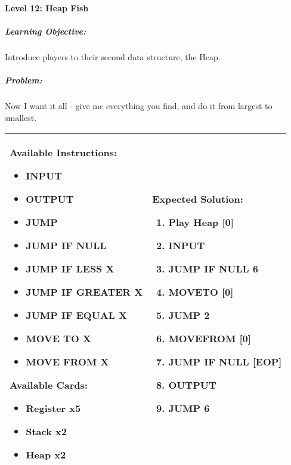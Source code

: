 \paragraph{Level 12: Heap Fish}
\subparagraph{Learning Objective:} Introduce players to their second data structure, the Heap.

\subparagraph{Problem:} Now I want it all - give me everything you find, and do it from largest to smallest.

\begin{center}
    \begin{tabular}{ | m{6cm} | m{8cm} | } 
        \hline
            \textbf{Available Instructions:} 
            \begin{itemize}
                \setlength\itemsep{-.35em}
                \item INPUT
                \item OUTPUT
                \item JUMP
                \item JUMP IF NULL
                \item JUMP IF LESS X
                \item JUMP IF GREATER X
	     \item JUMP IF EQUAL X
                \item MOVE TO X
                \item MOVE FROM X
            \end{itemize}
            \textbf{Available Cards:} 
            \begin{itemize}
                \setlength\itemsep{-.35em}
                \item Register x5
                \item Stack x2
                \item Heap x2
            \end{itemize}& 
            \textbf{Expected Solution:} 
            \begin{enumerate}
                \setlength\itemsep{-.35em}
                \item Play Heap [0]
                \item INPUT
                \item JUMP IF NULL 6
                \item MOVETO [0]
                \item JUMP 2
                \item MOVEFROM [0]
                \item JUMP IF NULL [EOP]
                \item OUTPUT
		\item JUMP 6
            \end{enumerate}
            \\
        \hline
    \end{tabular}
\end{center}


